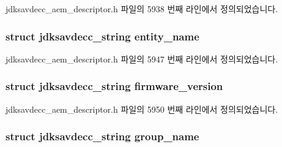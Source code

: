 jdksavdecc\+\_\+aem\+\_\+descriptor.\+h 파일의 5938 번째 라인에서 정의되었습니다.

\subsubsection[{\texorpdfstring{entity\+\_\+name}{entity_name}}]{\setlength{\rightskip}{0pt plus 5cm}struct {\bf jdksavdecc\+\_\+string} entity\+\_\+name}\hypertarget{structjdksavdecc__descriptor__entity_a4aea558819a980a1e6ab23e3fef33151}{}\label{structjdksavdecc__descriptor__entity_a4aea558819a980a1e6ab23e3fef33151}


jdksavdecc\+\_\+aem\+\_\+descriptor.\+h 파일의 5947 번째 라인에서 정의되었습니다.

\subsubsection[{\texorpdfstring{firmware\+\_\+version}{firmware_version}}]{\setlength{\rightskip}{0pt plus 5cm}struct {\bf jdksavdecc\+\_\+string} firmware\+\_\+version}\hypertarget{structjdksavdecc__descriptor__entity_a31689a4dc44469797d55d47ac09c66fc}{}\label{structjdksavdecc__descriptor__entity_a31689a4dc44469797d55d47ac09c66fc}


jdksavdecc\+\_\+aem\+\_\+descriptor.\+h 파일의 5950 번째 라인에서 정의되었습니다.

\subsubsection[{\texorpdfstring{group\+\_\+name}{group_name}}]{\setlength{\rightskip}{0pt plus 5cm}struct {\bf jdksavdecc\+\_\+string} group\+\_\+name}\hypertarget{structjdksavdecc__descriptor__entity_aec617f41572a72825fc2cc6a4a150c59}{}\label{structjdksavdecc__descriptor__entity_aec617f41572a72825fc2cc6a4a150c59}


